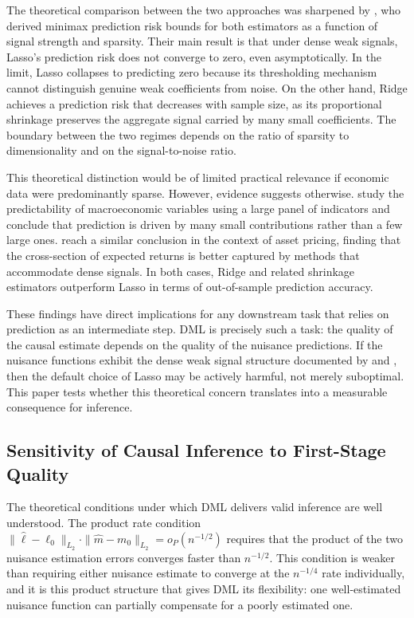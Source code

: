 \documentclass[a4paper,10.5pt]{article}
\begin{document}
The theoretical comparison between the two approaches was sharpened by \citet{shenxiu2025}, who derived minimax prediction risk bounds for both estimators as a function of signal strength and sparsity. Their main result is that under dense weak signals, Lasso's prediction risk does not converge to zero, even asymptotically. In the limit, Lasso collapses to predicting zero because its thresholding mechanism cannot distinguish genuine weak coefficients from noise. On the other hand, Ridge achieves a prediction risk that decreases with sample size, as its proportional shrinkage preserves the aggregate signal carried by many small coefficients. The boundary between the two regimes depends on the ratio of sparsity to dimensionality and on the signal-to-noise ratio.

This theoretical distinction would be of limited practical relevance if economic data were predominantly sparse. However, evidence suggests otherwise. \citet{giannone2021} study the predictability of macroeconomic variables using a large panel of indicators and conclude that prediction is driven by many small contributions rather than a few large ones. \citet{gu2020} reach a similar conclusion in the context of asset pricing, finding that the cross-section of expected returns is better captured by methods that accommodate dense signals. In both cases, Ridge and related shrinkage estimators outperform Lasso in terms of out-of-sample prediction accuracy.

These findings have direct implications for any downstream task that relies on prediction as an intermediate step. DML is precisely such a task: the quality of the causal estimate depends on the quality of the nuisance predictions. If the nuisance functions exhibit the dense weak signal structure documented by \citet{giannone2021} and \citet{gu2020}, then the default choice of Lasso may be actively harmful, not merely suboptimal. This paper tests whether this theoretical concern translates into a measurable consequence for inference.


\subsection{Sensitivity of Causal Inference to First-Stage Quality}\label{sec:lit_sensitivity}

The theoretical conditions under which DML delivers valid inference are well understood. The product rate condition $\|\hat{\ell} - \ell_0\|_{L_2} \cdot \|\hat{m} - m_0\|_{L_2} = o_P(n^{-1/2})$ requires that the product of the two nuisance estimation errors converges faster than $n^{-1/2}$. This condition is weaker than requiring either nuisance estimate to converge at the $n^{-1/4}$ rate individually, and it is this product structure that gives DML its flexibility: one well-estimated nuisance function can partially compensate for a poorly estimated one.
\end{document}
